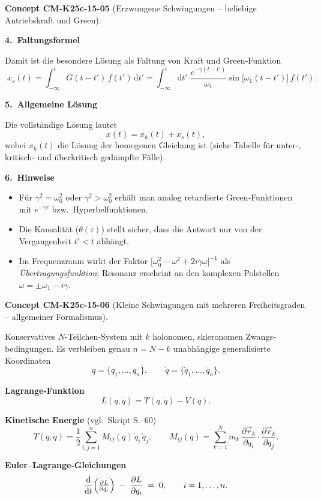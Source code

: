 \documentclass[10pt, letterpaper]{article}
\newcommand{\CustomHeading}[3]{%
  \par\medskip\noindent%
  \textbf{#1 #2} \textnormal{(#3)}.\enskip%
}
\newenvironment{CONC}[2]{\CustomHeading{Concept}{#1}{#2}}{}
\begin{document}
\begin{CONC}{CM-K25c-15-05}{Erzwungene Schwingungen – beliebige Antriebskraft und Green}
\textbf{4.\ Faltungsformel}

Damit ist die besondere Lösung als Faltung von Kraft und Green‐Funktion
\[
  \boxed{\;
    x_s(t)=
      \int_{-\infty}^{t}\!G(t-t')\,f(t')\,\mathrm dt'}
  =
  \int_{-\infty}^{t}\!
     \mathrm dt'\;
     \frac{e^{-\gamma(t-t')}}{\omega_{1}}
     \sin\bigl[\omega_{1}(t-t')\bigr]\,
     f(t').
\]

\textbf{5.\ Allgemeine Lösung}

Die vollständige Lösung lautet
\[
  x(t)=x_h(t)+x_s(t),
\]
wobei \(x_h(t)\) die Lösung der homogenen Gleichung ist  
(siehe Tabelle für unter-, kritisch- und überkritisch gedämpfte Fälle).

\textbf{6.\ Hinweise}

\begin{itemize}
  \item Für \(\gamma^{2}=\omega_{0}^{2}\) oder \(\gamma^{2}>\omega_{0}^{2}\) 
        erhält man analog retardierte Green‐Funktionen mit
        \(e^{-\gamma\tau}\) bzw.\ Hyperbelfunktionen.
  \item Die Kausalität (\(\theta(\tau)\)) stellt sicher, dass die Antwort
        nur von der Vergangenheit \(t'<t\) abhängt.
  \item Im Frequenzraum wirkt der Faktor
        \(\bigl[\omega_{0}^{2}-\omega^{2}+2i\gamma\omega\bigr]^{-1}\)
        als \emph{Übertragungsfunktion}; Resonanz erscheint an den
        komplexen Polstellen \(\omega=\pm\omega_{1}-i\gamma\).
\end{itemize}
\end{CONC}

\begin{CONC}{CM-K25c-15-06}{Kleine Schwingungen mit mehreren Freiheitsgraden – allgemeiner Formalismus}
Konservatives $N$-Teilchen-System mit $k$ holonomen, skleronomen Zwangs­bedingungen.  
Es verbleiben genau $n=N-k$ unabhängige generalisierte Koordinaten
\[
  q=\{q_1,\dots,q_n\},\qquad 
  \dot q=\{\dot q_1,\dots,\dot q_n\}.
\]

\textbf{Lagrange-Funktion}  
\[
  L(q,\dot q)=T(q,\dot q)-V(q).
\]

\textbf{Kinetische Energie}  (vgl.\ Skript S.~60)  
\[
  T(q,\dot q)=\frac12\sum_{i,j=1}^{n} M_{ij}(q)\,\dot q_i\,\dot q_j,
  \qquad
  M_{ij}(q)=\sum_{k=1}^{N}
            m_k\,
            \frac{\partial\vec r_k}{\partial q_i}\!\cdot\!
            \frac{\partial\vec r_k}{\partial q_j}.
\]

\textbf{Euler–Lagrange‐Gleichungen}  
\[
  \frac{\mathrm d}{\mathrm dt}\Bigl(\tfrac{\partial L}{\partial\dot q_i}\Bigr)
  \;-\;
  \frac{\partial L}{\partial q_i}
  \;=\;0,
  \qquad
  i=1,\dots,n.
\]
\end{CONC}
\end{document}
